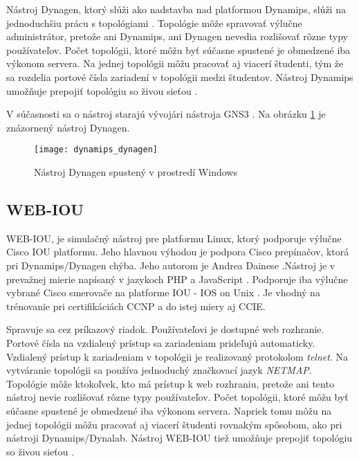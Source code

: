 Nástroj Dynagen, ktorý slúži ako nadstavba nad platformou Dynamips, slúži na jednoduchšiu prácu s topológiami \cite{dynamips}. Topológie môže spravovať výlučne administrátor, pretože ani Dynamips, ani Dynagen nevedia rozlišovať rôzne typy používateľov. Počet topológii, ktoré môžu byť súčasne spustené je obmedzené iba výkonom servera. Na jednej topológii môžu pracovať aj viacerí študenti, tým že sa rozdelia portové čísla zariadení v topológii medzi študentov. Nástroj Dynamips umožňuje prepojiť topológiu so živou sieťou \cite{dynamips, dynamips_nil}. 

V súčasnosti sa o nástroj starajú vývojári nástroja GNS3 \cite{dynamips_github}. Na obrázku \ref{obr:dynamips_dynagen} je znázornený nástroj Dynagen.

\begin{figure}
    \centering
    \texttt{[image: dynamips\_dynagen]}
    \caption{Nástroj Dynagen spustený v prostredí Windows} \cite{obr_dynamips_dynagen}
    \label{obr:dynamips_dynagen}
\end{figure}

\subsection{WEB-IOU}

WEB-IOU, je simulačný nástroj pre platformu Linux, ktorý podporuje výlučne Cisco IOU platformu. Jeho hlavnou výhodou je podpora Cisco prepínačov, ktorá pri Dynamips/Dynagen chýba. Jeho autorom je Andrea Dainese \cite{webiou_github, webiou_unetlab_unetlabv2}.Nástroj je v prevažnej mierie napísaný v jazykoch PHP a JavaScript \cite{webiou_github}. Podporuje iba výlučne vybrané Cisco smerovače na platforme IOU - IOS on Unix \cite{webiou_firewall_cx}. Je vhodný na trénovanie pri certifikáciách CCNP a do istej miery aj CCIE. 

Spravuje sa cez príkazový riadok. Používateľovi je dostupné web rozhranie. Portové čísla na vzdialený prístup sa zariadeniam prideľujú automaticky. Vzdialený prístup k zariadeniam v topológii je realizovaný protokolom \emph{telnet}. Na vytváranie topológii sa používa jednoduchý značkovací jazyk \emph{NETMAP}. Topológie môže ktokoľvek, kto má prístup k web rozhraniu, pretože ani tento nástroj nevie rozlišovať rôzne typy používateľov. Počet topológii, ktoré môžu byť súčasne spustené je obmedzené iba výkonom servera. Napriek tomu môžu na jednej topológii môžu pracovať aj viacerí študenti rovnakým spôsobom, ako pri nástroji Dynamips/Dynalab. Nástroj WEB-IOU tiež umožňuje prepojiť topológiu so živou sieťou \cite{webiou_real_network}. 

